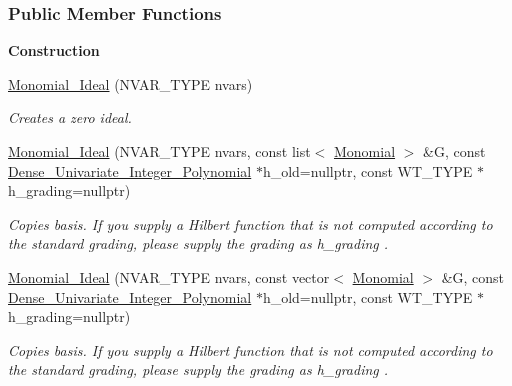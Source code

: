 \subsubsection*{Public Member Functions}
\begin{Indent}\textbf{ Construction}\par
\begin{DoxyCompactItemize}
\item 
\mbox{\label{group__polygroup_a1c1ca0ff8991217e18bb263c7ecfc316}} 
\hyperlink{group__polygroup_a1c1ca0ff8991217e18bb263c7ecfc316}{Monomial\+\_\+\+Ideal} (N\+V\+A\+R\+\_\+\+T\+Y\+PE nvars)
\begin{DoxyCompactList}\small\item\em Creates a zero ideal. \end{DoxyCompactList}\item 
\mbox{\label{group__polygroup_a7db4fc98fce195b0d0ba5fa9c89292a0}} 
\hyperlink{group__polygroup_a7db4fc98fce195b0d0ba5fa9c89292a0}{Monomial\+\_\+\+Ideal} (N\+V\+A\+R\+\_\+\+T\+Y\+PE nvars, const list$<$ \hyperlink{group__polygroup_class_monomial}{Monomial} $>$ \&G, const \hyperlink{group__polygroup_class_dense___univariate___integer___polynomial}{Dense\+\_\+\+Univariate\+\_\+\+Integer\+\_\+\+Polynomial} $\ast$h\+\_\+old=nullptr, const W\+T\+\_\+\+T\+Y\+PE $\ast$h\+\_\+grading=nullptr)
\begin{DoxyCompactList}\small\item\em Copies {\ttfamily basis}. If you supply a Hilbert function that is not computed according to the standard grading, please supply the grading as {\ttfamily h\+\_\+grading} . \end{DoxyCompactList}\item 
\mbox{\label{group__polygroup_af10301d05f7eac529acca28831e54eac}} 
\hyperlink{group__polygroup_af10301d05f7eac529acca28831e54eac}{Monomial\+\_\+\+Ideal} (N\+V\+A\+R\+\_\+\+T\+Y\+PE nvars, const vector$<$ \hyperlink{group__polygroup_class_monomial}{Monomial} $>$ \&G, const \hyperlink{group__polygroup_class_dense___univariate___integer___polynomial}{Dense\+\_\+\+Univariate\+\_\+\+Integer\+\_\+\+Polynomial} $\ast$h\+\_\+old=nullptr, const W\+T\+\_\+\+T\+Y\+PE $\ast$h\+\_\+grading=nullptr)
\begin{DoxyCompactList}\small\item\em Copies {\ttfamily basis}. If you supply a Hilbert function that is not computed according to the standard grading, please supply the grading as {\ttfamily h\+\_\+grading} . \end{DoxyCompactList}\item 

\end{DoxyCompactItemize}
\end{Indent}
